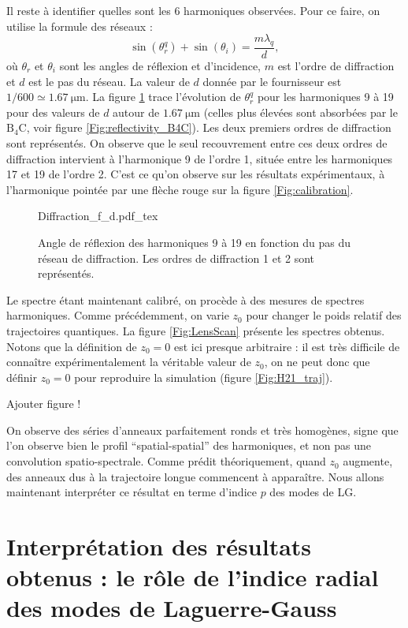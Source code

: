Il reste à identifier quelles sont les 6 harmoniques observées. Pour ce faire, on utilise la formule des réseaux :
\[\sin(\theta_r^q)+\sin(\theta_i) = \frac{m\lambda_q}{d},\]
où $\theta_r$ et $\theta_i$ sont les angles de réflexion et d'incidence, $m$ est l'ordre de diffraction et $d$ est le pas du réseau. La valeur de $d$ donnée par le fournisseur est $1/600\simeq \SI{1.67}{\micro \metre}$. La figure \ref{fig:formulereseau} trace l'évolution de $\theta_r^q$ pour les harmoniques 9 à 19 pour des valeurs de $d$ autour de $\SI{1.67}{\micro\metre}$ (celles plus élevées sont absorbées par le $\mathrm{B}_\mathrm{4}\mathrm{C}$, voir figure \ref{Fig:reflectivity_B4C}). Les deux premiers ordres de diffraction sont représentés. On observe que le seul recouvrement entre ces deux ordres de diffraction intervient à l'harmonique 9 de l'ordre 1, située entre les harmoniques 17 et 19 de l'ordre 2. C'est ce qu'on observe sur les résultats expérimentaux, à l'harmonique pointée par une flèche rouge sur la figure \ref{Fig:calibration}. 

\begin{figure}[!ht]
\centering
\def\svgwidth{1\columnwidth}
{Diffraction_f_d.pdf_tex}
\caption{Angle de réflexion des harmoniques 9 à 19 en fonction du pas du réseau de diffraction. Les ordres de diffraction 1 et 2 sont représentés.}
\label{fig:formulereseau}
\end{figure}

Le spectre étant maintenant calibré, on procède à des mesures de spectres harmoniques. Comme précédemment, on varie $z_0$ pour changer le poids relatif des trajectoires quantiques. La figure \ref{Fig:LensScan} présente les spectres obtenus. Notons que la définition de $z_0=0$ est ici presque arbitraire : il est très difficile de connaître expérimentalement la véritable valeur de $z_0$, on ne peut donc que définir $z_0=0$ pour reproduire la simulation (figure \ref{Fig:H21_traj}).

\textcolor[rgb]{1,0,0}{Ajouter figure !}

On observe des séries d'anneaux parfaitement ronds et très homogènes, signe que l'on observe bien le profil ``spatial-spatial'' des harmoniques, et non pas une convolution spatio-spectrale. Comme prédit théoriquement, quand $z_0$ augmente, des anneaux dus à la trajectoire longue commencent à apparaître. Nous allons maintenant interpréter ce résultat en terme d'indice $p$ des modes de LG.

\section{Interprétation des résultats obtenus : le rôle de l'indice radial des modes de Laguerre-Gauss}
